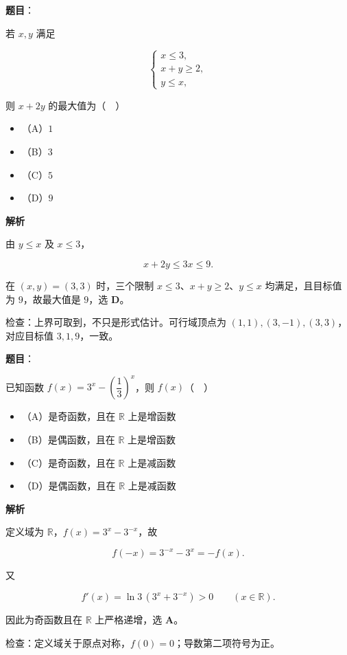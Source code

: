 \begin{answer}

\textbf{题目}：

若 $x,y$ 满足

\nopagebreak[4]
\[
\begin{cases}
x\leqslant3,\\
x+y\geqslant2,\\
y\leqslant x,
\end{cases}
\]

则 $x+2y$ 的最大值为（　）

\begin{itemize}
\item （A）$1$
\item （B）$3$
\item （C）$5$
\item （D）$9$
\end{itemize}

\textbf{解析}

由 $y\leqslant x$ 及 $x\leqslant3$，

\nopagebreak[4]
\[x+2y\leqslant3x\leqslant9.\]

在 $(x,y)=(3,3)$ 时，三个限制 $x\leqslant3$、$x+y\geqslant2$、$y\leqslant x$ 均满足，且目标值为 $9$，故最大值是 $9$，选 \textbf{D}。

检查：上界可取到，不只是形式估计。可行域顶点为 $(1,1),(3,-1),(3,3)$，对应目标值 $3,1,9$，一致。


\end{answer}
\begin{answer}

\textbf{题目}：

已知函数 $f(x)=3^x-\left(\dfrac13\right)^x$，则 $f(x)$（　）

\begin{itemize}
\item （A）是奇函数，且在 $\mathbb R$ 上是增函数
\item （B）是偶函数，且在 $\mathbb R$ 上是增函数
\item （C）是奇函数，且在 $\mathbb R$ 上是减函数
\item （D）是偶函数，且在 $\mathbb R$ 上是减函数
\end{itemize}

\textbf{解析}

定义域为 $\mathbb R$，$f(x)=3^x-3^{-x}$，故

\nopagebreak[4]
\[f(-x)=3^{-x}-3^x=-f(x).\]

又

\nopagebreak[4]
\[f'(x)=\ln3\,(3^x+3^{-x})>0\qquad(x\in\mathbb R).\]

因此为奇函数且在 $\mathbb R$ 上严格递增，选 \textbf{A}。

检查：定义域关于原点对称，$f(0)=0$；导数第二项符号为正。


\end{answer}
